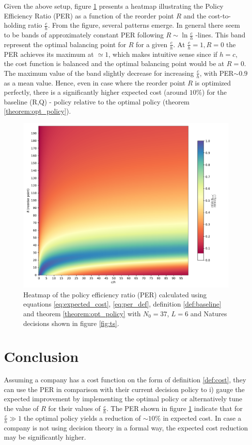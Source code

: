 \documentclass[a4paper,12pt]{article}
\begin{document}
	Given the above setup, figure \ref{fig:per} presents a heatmap illustrating the Policy Efficiency Ratio (PER) as a function of the reorder point $R$ and the cost-to-holding ratio $\frac{c}{h}$. From the figure, several patterns emerge. In general there seem to be bands of approximately constant PER following $R\sim \ln\frac{c}{h}$ -lines. This band represent the optimal balancing point for $R$ for a given $\frac{c}{h}$. At $\frac{c}{h}=1, R=0$ the PER achieves its maximum at $\simeq 1$, which makes intuitive sense since if $h=c$, the cost function is balanced and the optimal balancing point would be at $R=0$. The maximum value of the band slightly decrease for increasing $\frac{c}{h}$, with PER$\sim 0.9$ as a mean value. Hence, even in case where the reorder point $R$ is optimized perfectly, there is a significantly higher expected cost (around $10\%$) for the baseline (R,Q) - policy relative to the optimal policy (theorem \ref{theorem:opt_policy}). 
	\begin{figure}[h!]
		\centering
		\includegraphics[width=1\textwidth]{figures/per.pdf}
		\caption{Heatmap of the policy efficiency ratio (PER) calculated using equations \eqref{eq:expected_cost}, \eqref{eq:per_def}, definition \ref{def:baseline} and theorem \ref{theorem:opt_policy} with $N_0=37$, $L=6$ and Natures decisions shown in figure \ref{fig:ts}.}
		\label{fig:per}
	\end{figure}

	
	\section{Conclusion}
	Assuming a company has a cost function on the form of definition \ref{def:cost}, they can use the PER in comparison with their current decision policy to i) gauge the expected improvement by implementing the optimal policy or alternatively tune the value of $R$ for their values of $\frac{c}{h}$. The PER shown in figure \ref{fig:per} indicate that for $\frac{c}{h}\gg 1$ the optimal policy yields a reduction of $\sim 10\%$ in expected cost. In case a company is not using decision theory in a formal way, the expected cost reduction may be significantly higher. 
	
\end{document}
